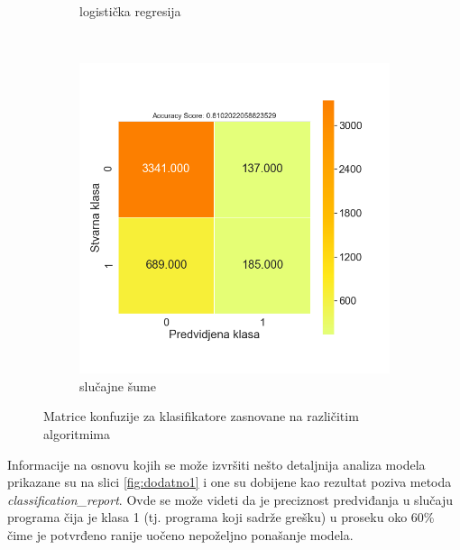 \documentclass[12pt,oneside]{memoir}
\begin{document}
\begin{figure}[!ht]
\begin{subfigure}[b]{0.45\textwidth}
        \caption{logistička regresija}
        \label{fig:logreg}
    \end{subfigure}
    \\
    \begin{subfigure}[b]{0.45\textwidth}
        \centering
        \includegraphics[width=\textwidth]{RF_basic_data_confussion_matrix}
        \caption{slučajne šume}
        \label{fig:randfor}
    \end{subfigure}
    \caption{Matrice konfuzije za klasifikatore zasnovane na različitim algoritmima}
    \label{fig:confmatr}
\end{figure}

Informacije na osnovu kojih se može izvršiti nešto detaljnija analiza modela prikazane su na slici \ref{fig:dodatno1} i one su dobijene kao rezultat poziva metoda \textit{classification\_report}. Ovde se može videti da je preciznost predviđanja u slučaju programa čija je klasa 1 (tj. programa koji sadrže grešku) u proseku oko 60\% čime je potvrđeno ranije uočeno nepoželjno ponašanje modela. 
\end{document}
